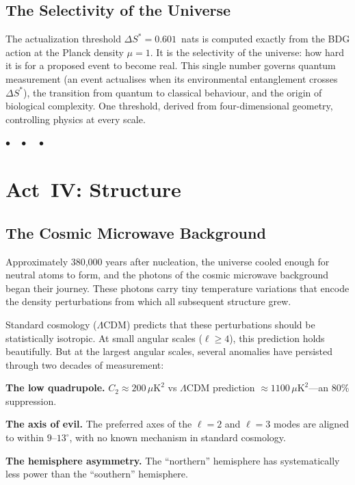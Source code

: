 \documentclass[12pt,a4paper]{article}
\begin{document}
\subsection{The Selectivity of the Universe}

The actualization threshold $\Delta S^* = 0.601$~nats is computed exactly from the BDG action at the Planck density $\mu=1$. It is the selectivity of the universe: how hard it is for a proposed event to become real. This single number governs quantum measurement (an event actualises when its environmental entanglement crosses~$\Delta S^*$), the transition from quantum to classical behaviour, and the origin of biological complexity. One threshold, derived from four-dimensional geometry, controlling physics at every scale.

\bigskip\begin{center}$\bullet\quad\bullet\quad\bullet$\end{center}\bigskip

\section{Act~IV: Structure}

\subsection{The Cosmic Microwave Background}

Approximately 380,000 years after nucleation, the universe cooled enough for neutral atoms to form, and the photons of the cosmic microwave background began their journey. These photons carry tiny temperature variations that encode the density perturbations from which all subsequent structure grew.

Standard cosmology ($\Lambda$CDM) predicts that these perturbations should be statistically isotropic. At small angular scales ($\ell \geq 4$), this prediction holds beautifully. But at the largest angular scales, several anomalies have persisted through two decades of measurement:

\textbf{The low quadrupole.} $C_2 \approx 200\,\mu\mathrm{K}^2$ vs $\Lambda$CDM prediction $\approx 1100\,\mu\mathrm{K}^2$---an 80\% suppression.

\textbf{The axis of evil.} The preferred axes of the $\ell=2$ and $\ell=3$ modes are aligned to within $9$--$13^\circ$, with no known mechanism in standard cosmology.

\textbf{The hemisphere asymmetry.} The ``northern'' hemisphere has systematically less power than the ``southern'' hemisphere.
\end{document}
